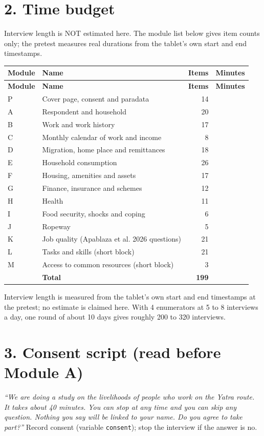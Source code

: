 \documentclass[10pt]{article}
\begin{document}
\section*{2. Time budget}
Interview length is NOT estimated here. The module list below gives item counts only; the pretest measures real durations from the tablet's own start and end timestamps.
{\small
\begin{longtable}{llrr}
\toprule
\textbf{Module} & \textbf{Name} & \textbf{Items} & \textbf{Minutes} \\
\midrule
\endfirsthead
\toprule
\textbf{Module} & \textbf{Name} & \textbf{Items} & \textbf{Minutes} \\
\midrule
\endhead
P & Cover page, consent and paradata & 14 \\
A & Respondent and household & 20 \\
B & Work and work history & 17 \\
C & Monthly calendar of work and income & 8 \\
D & Migration, home place and remittances & 18 \\
E & Household consumption & 26 \\
F & Housing, amenities and assets & 17 \\
G & Finance, insurance and schemes & 12 \\
H & Health & 11 \\
I & Food security, shocks and coping & 6 \\
J & Ropeway & 5 \\
K & Job quality (Apablaza et al. 2026 questions) & 21 \\
L & Tasks and skills (short block) & 21 \\
M & Access to common resources (short block) & 3 \\
 & \textbf{Total} & \textbf{199} \\
\bottomrule
\end{longtable}
}

Interview length is measured from the tablet's own start and end timestamps at the pretest; no estimate is claimed here.
With 4 enumerators at 5 to 8 interviews a day, one round of about 10 days gives roughly 200 to 320 interviews.

\section*{3. Consent script (read before Module A)}
\textit{``We are doing a study on the livelihoods of people who work on the Yatra route. It takes about 40 minutes. You can stop at any time and you can skip any question. Nothing you say will be linked to your name.
Do you agree to take part?''} Record consent (variable \texttt{consent}); stop the interview if the answer is no.
\end{document}
